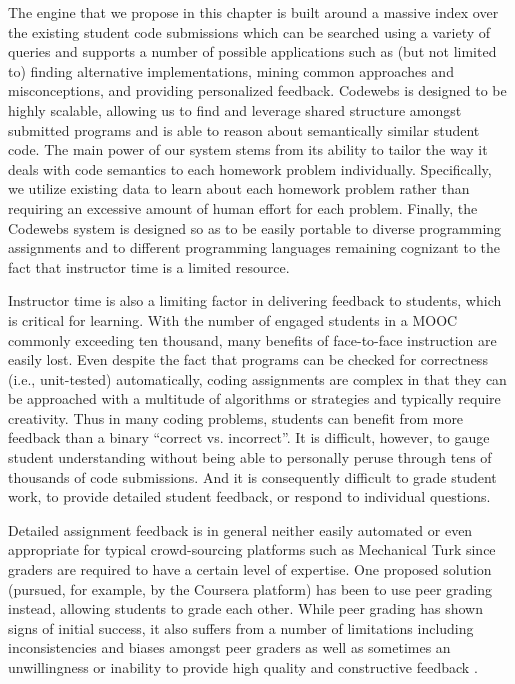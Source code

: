  The engine that we propose in this chapter is built around a massive index over the existing student code submissions
which can be searched using a variety of queries and supports a number of possible applications such as (but not limited to)
finding alternative implementations, mining common approaches and misconceptions, and providing personalized feedback.
Codewebs is designed to be highly scalable, allowing us to
find and leverage shared structure amongst submitted programs and is able to reason about semantically similar student code.
The main power of our system stems from its ability to tailor the way it deals with code semantics to each homework problem individually.
Specifically, we
utilize existing data to learn about each homework problem rather than requiring an excessive amount of human effort for each problem.
Finally, the Codewebs system is designed so as to be easily portable to diverse programming assignments
and to different programming languages remaining cognizant to the fact that instructor time is a limited resource.

Instructor time is also a limiting factor in delivering feedback to students, which is critical for learning.
With the number of engaged students in a MOOC commonly exceeding ten thousand, many benefits of face-to-face instruction are easily lost.
Even despite the fact that programs can be checked for correctness (i.e., unit-tested) automatically, coding assignments are complex in that they can 
be approached with a multitude of algorithms or strategies and typically require creativity. 
Thus in many coding problems, students can benefit from more feedback than a binary ``correct vs. incorrect''.   
It is difficult, however, to gauge student understanding without being able to personally peruse through  tens of thousands of code submissions.
And it is consequently difficult to grade student work, to provide detailed student feedback, or respond to individual questions. 

 Detailed assignment feedback is in general neither easily automated or even appropriate for typical crowd-sourcing platforms such as Mechanical Turk since graders are required to have a certain level of expertise.  One proposed solution (pursued, for example, by the Coursera platform) has been to use peer grading instead, allowing students to grade each other. While peer grading has shown signs of initial success, it also suffers from a number of limitations including inconsistencies and biases amongst peer graders as well as sometimes an unwillingness or inability to provide high quality and constructive feedback \cite{piech13}.

